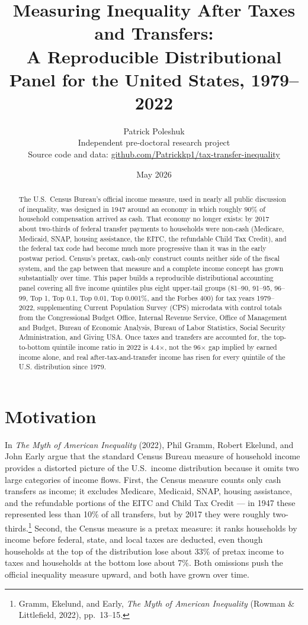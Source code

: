 \documentclass[11pt,letterpaper]{article}
\title{\textbf{Measuring Inequality After Taxes and Transfers:\\
\large A Reproducible Distributional Panel for the United States, 1979--2022}}
\author{Patrick Poleshuk\\
\small Independent pre-doctoral research project\\
\small Source code and data:
\href{https://github.com/Patrickkp1/tax-transfer-inequality}{\small github.com/Patrickkp1/tax-transfer-inequality}}
\date{May 2026}
\begin{document}
\maketitle

\begin{abstract}
\noindent The U.S.\ Census Bureau's official income measure, used in nearly all
public discussion of inequality, was designed in 1947 around an economy in which
roughly 90\% of household compensation arrived as cash. That economy no longer
exists: by 2017 about two-thirds of federal transfer payments to households
were non-cash (Medicare, Medicaid, SNAP, housing assistance, the EITC, the
refundable Child Tax Credit), and the federal tax code had become much more
progressive than it was in the early postwar period. Census's pretax,
cash-only construct counts neither side of the fiscal system, and the gap
between that measure and a complete income concept has grown substantially over
time. This paper builds a reproducible distributional accounting panel covering
all five income quintiles plus eight upper-tail groups (81--90, 91--95, 96--99,
Top 1, Top 0.1, Top 0.01, Top 0.001\%, and the Forbes 400) for tax years
1979--2022, supplementing Current Population Survey (CPS) microdata with
control totals from the Congressional Budget Office, Internal Revenue Service,
Office of Management and Budget, Bureau of Economic Analysis, Bureau of Labor
Statistics, Social Security Administration, and Giving USA. Once taxes and
transfers are accounted for, the top-to-bottom quintile income ratio in 2022
is 4.4\(\times\), not the 96\(\times\) gap implied by earned income alone, and
real after-tax-and-transfer income has risen for every quintile of the U.S.
distribution since 1979.
\end{abstract}

\section{Motivation}

In \emph{The Myth of American Inequality} (2022), Phil Gramm, Robert Ekelund, and
John Early argue that the standard Census Bureau measure of household income
provides a distorted picture of the U.S.\ income distribution because it
omits two large categories of income flows. First, the Census measure counts
only cash transfers as income; it excludes Medicare, Medicaid, SNAP, housing
assistance, and the refundable portions of the EITC and Child Tax Credit ---
in 1947 these represented less than 10\% of all transfers, but by 2017 they
were roughly two-thirds.\footnote{Gramm, Ekelund, and Early, \emph{The Myth of
American Inequality} (Rowman \& Littlefield, 2022), pp.\ 13--15.} Second, the
Census measure is a pretax measure: it ranks households by income before
federal, state, and local taxes are deducted, even though households at the
top of the distribution lose about 33\% of pretax income to taxes and households
at the bottom lose about 7\%. Both omissions push the official inequality measure
upward, and both have grown over time.
\end{document}
